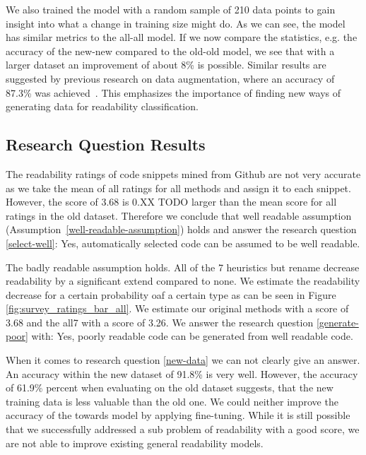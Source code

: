 \documentclass[%
class=scrreprt,
chapterprefix=false,%
open=right,%
twoside=false,%
paper=a4,%
logofile={Logo\_zentral\_farbig\_EN.png},%
thesistype=master,%
UKenglish,%
]{se2thesis}
\theoremstyle{definition}
\begin{document}
	We also trained the model with a random sample of 210 data points to gain insight into what a change in training size might do. As we can see, the model has similar metrics to the all-all model. If we now compare the statistics, e.g. the accuracy of the new-new compared to the old-old model, we see that with a larger dataset an improvement of about 8\% is possible. Similar results are suggested by previous research on data augmentation, where an accuracy of 87.3\% was achieved~\citeauthor{mi2021effectiveness}. This emphasizes the importance of finding new ways of generating data for readability classification. 
	
\subsection{Research Question Results} \label{Research Question Results}


	The readability ratings of code snippets mined from Github are not very accurate as we take the mean of all ratings for all methods and assign it to each snippet. However, the score of 3.68 is 0.XX TODO larger than the mean score for all ratings in the old dataset. Therefore we conclude that well readable assumption (Assumption~\ref{well-readable-assumption}) holds and answer the research question \ref{select-well}: Yes, automatically selected code can be assumed to be well readable.
	
	The badly readable assumption holds. All of the 7 heuristics but rename decrease readability by a significant extend compared to none. We estimate the readability decrease for a certain probability oaf a certain type as can be seen in Figure \ref{fig:survey_ratings_bar_all}. We estimate our original methods with a score of 3.68 and the all7 with a score of 3.26. We answer the research question \ref{generate-poor} with: Yes, poorly readable code can be generated from well readable code.
	
	When it comes to research question \ref{new-data} we can not clearly give an answer. An accuracy within the new dataset of 91.8\% is very well. However, the accuracy of 61.9\% percent when evaluating on the old dataset suggests, that the new training data is less valuable than the old one. We could neither improve the accuracy of the towards model by applying fine-tuning. While it is still possible that we successfully addressed a sub problem of readability with a good score, we are not able to improve existing general readability models.
		
\end{document}

